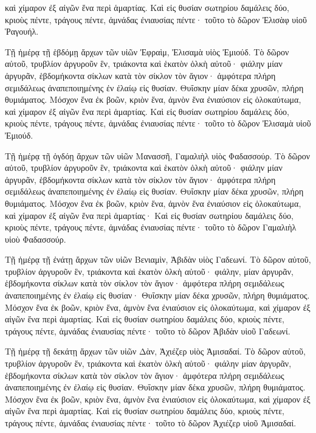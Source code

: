 {καὶ χίμαρον ἐξ αἰγῶν ἕνα περὶ ἁμαρτίας.
Καὶ εἰς θυσίαν σωτηρίου δαμάλεις δύο, κριοὺς πέντε, τράγους πέντε, ἀμνάδας ἐνιαυσίας πέντε· τοῦτο τὸ δῶρον Ἐλισὰφ υἱοῦ Ῥαγουήλ.
\par }{\PP {}Τῇ ἡμέρᾳ τῇ ἑβδόμῃ ἄρχων τῶν υἱῶν Ἐφραὶμ, Ἐλισαμὰ υἱὸς Ἐμιούδ.
Τὸ δῶρον αὐτοῦ, τρυβλίον ἀργυροῦν ἓν, τριάκοντα καὶ ἑκατὸν ὁλκὴ αὐτοῦ· φιάλην μίαν ἀργυρᾶν, ἑβδομήκοντα σίκλων κατὰ τὸν σίκλον τὸν ἅγιον· ἀμφότερα πλήρη σεμιδάλεως ἀναπεποιημένης ἐν ἐλαίῳ εἰς θυσίαν.
Θυΐσκην μίαν δέκα χρυσῶν, πλήρη θυμιάματος.
Μόσχον ἕνα ἐκ βοῶν, κριὸν ἕνα, ἀμνὸν ἕνα ἐνιαύσιον εἰς ὁλοκαύτωμα,
καὶ χίμαρον ἐξ αἰγῶν ἕνα περὶ ἁμαρτίας.
Καὶ εἰς θυσίαν σωτηρίου δαμάλεις δύο, κριοὺς πέντε, τράγους πέντε, ἀμνάδας ἐνιαυσίας πέντε· τοῦτο τὸ δῶρον Ἐλισαμὰ υἱοῦ Ἐμιούδ.
\par }{\PP {}Τῇ ἡμέρᾳ τῇ ὀγδόῃ ἄρχων τῶν υἱῶν Μανασσῆ, Γαμαλιὴλ υἱὸς Φαδασσούρ.
Τὸ δῶρον αὐτοῦ, τρυβλίον ἀργυροῦν ἓν, τριάκοντα καὶ ἑκατὸν ὁλκὴ αὐτοῦ· φιάλην μίαν ἀργυρᾶν, ἑβδομήκοντα σίκλων κατὰ τὸν σίκλον τὸν ἅγιον· ἀμφότερα πλήρη σεμιδάλεως ἀναπεποιημένης ἐν ἐλαίῳ εἰς θυσίαν.
Θυΐσκην μίαν δέκα χρυσῶν, πλήρη θυμιάματος.
Μόσχον ἕνα ἐκ βοῶν, κριὸν ἕνα, ἀμνὸν ἕνα ἐνιαύσιον εἰς ὁλοκαύτωμα,
καὶ χίμαρον ἐξ αἰγῶν ἕνα περὶ ἁμαρτίας·
Καὶ εἰς θυσίαν σωτηρίου δαμάλεις δύο, κριοὺς πέντε, τράγους πέντε, ἀμνάδας ἐνιαυσίας πέντε· τοῦτο τὸ δῶρον Γαμαλιὴλ υἱοὺ Φαδασσούρ.
\par }{\PP {}Τῇ ἡμέρᾳ τῇ ἐνάτῃ ἄρχων τῶν υἱῶν Βενιαμὶν, Ἀβιδὰν υἱὸς Γαδεωνί.
Τὸ δῶρον αὐτοῦ, τρυβλίον ἀργυροῦν ἓν, τριάκοντα καὶ ἑκατὸν ὁλκὴ αὐτοῦ· φιάλην, μίαν ἀργυρᾶν, ἑβδομήκοντα σίκλων κατὰ τὸν σίκλον τὸν ἅγιον· ἀμφότερα πλήρη σεμιδάλεως ἀναπεποιημένης ἐν ἐλαίῳ εἰς θυσίαν·
Θυΐσκην μίαν δέκα χρυσῶν, πλήρη θυμιάματος.
Μόσχον ἕνα ἐκ βοῶν, κριὸν ἕνα, ἀμνὸν ἕνα ἐνιαύσιον εἰς ὁλοκαύτωμα,
καὶ χίμαρον ἐξ αἰγῶν ἕνα περὶ ἁμαρτίας.
Καὶ εἰς θυσίαν σωτηρίου δαμάλεις δύο, κριοὺς πέντε, τράγους πέντε, ἀμνάδας ἐνιαυσίας πέντε· τοῦτο τὸ δῶρον Ἀβιδὰν υἱοῦ Γαδεωνί.
\par }{\PP {}Τῇ ἡμέρᾳ τῇ δεκάτῃ ἄρχων τῶν υἱῶν Δὰν, Ἀχιέζερ υἱὸς Ἀμισαδαί.
Τὸ δῶρον αὐτοῦ, τρυβλίον ἀργυροῦν ἕν, τριάκοντα καὶ ἑκατὸν ὁλκὴ αὐτοῦ· φιάλην μίαν ἀργυρᾶν, ἑβδομήκοντα σίκλων κατὰ τὸν σίκλον τὸν ἅγιον· ἀμφότερα πλήρη σεμιδάλεως ἀναπεποιημένης ἐν ἐλαίῳ εἰς θυσίαν.
Θυΐσκην μίαν δέκα χρυσῶν, πλήρη θυμιάματος.
Μόσχον ἕνα ἐκ βοῶν, κριὸν ἕνα, ἀμνὸν ἕνα ἐνιαύσιον εἰς ὁλοκαύτωμα,
καὶ χίμαρον ἐξ αἰγῶν ἕνα περὶ ἁμαρτίας.
Καὶ εἰς θυσίαν σωτηρίου δαμάλεις δύο, κριοὺς πέντε, τράγους πέντε, ἀμνάδας ἐνιαυσίας πέντε· τοῦτο τὸ δῶρον Ἀχιέζερ υἱοῦ Ἀμισαδαί.
}
